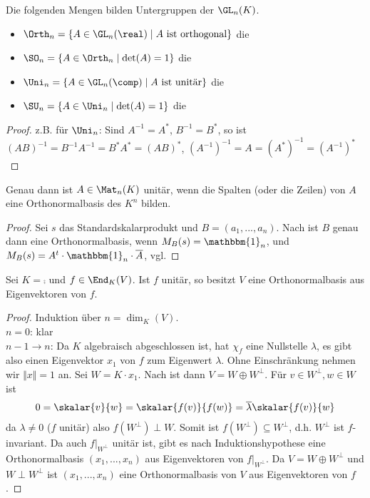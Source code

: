 \begin{proposition}
	Die folgenden Mengen bilden Untergruppen der $\GL_n(K)$.
	\begin{itemize}
		\item $\Orth_n=\{A\in\GL_n(\real)\mid A\text{ ist orthogonal}\}$ die 
		\item $\SO_n=\{A\in \Orth_n\mid \det(A)=1\}$ die 
		\item $\Uni_n=\{A\in\GL_n(\comp)\mid A\text{ ist unitär}\}$ die 
		\item $\SU_n=\{A\in \Uni_n\mid \det(A)=1\}$ die 
	\end{itemize}
\end{proposition}
\begin{proof}
	z.B. für $\Uni_n$: Sind $A^{-1}=A^*$, $B^{-1}=B^*$, so ist $(AB)^{-1}=B^{-1}A^{-1}=B^*A^*=(AB)^*$, $(A^{-1})^{-1}=A=(A^*)^{-1}=(A^{-1})^*$
\end{proof}

\begin{proposition}
	Genau dann ist $A\in\Mat_n(K)$ unitär, wenn die Spalten (oder die Zeilen) von $A$ eine Orthonormalbasis des $K^n$ bilden. 
\end{proposition}
\begin{proof}
	Sei $s$ das Standardskalarprodukt und $B=(a_1,...,a_n)$. Nach  ist $B$ genau dann eine Orthonormalbasis, wenn $M_B(s)=\mathbbm{1}_n$, und $M_B(s)=A^t\cdot\mathbbm{1}_n\cdot\overline{A}$, vgl. 
\end{proof}

\begin{theorem}
	Sei $K=\comp$ und $f\in\End_K(V)$. Ist $f$ unitär, so besitzt $V$ eine Orthonormalbasis aus Eigenvektoren von $f$.
\end{theorem}
\begin{proof}
	Induktion über $n=\dim_K(V)$. \\
	\emph{$n=0$}: klar \\
	\emph{$n-1\to n$}: Da $K$ algebraisch abgeschlossen ist, hat $\chi_f$ eine Nullstelle $\lambda$, es gibt also einen Eigenvektor $x_1$ von $f$ zum Eigenwert $\lambda$. Ohne Einschränkung nehmen wir $\Vert x\Vert=1$ an. Sei $W=K\cdot x_1$. Nach  ist dann $V=W\oplus W^\perp$. Für $v\in W^\perp, w\in W$ ist
	\begin{align}
		0=\skalar{v}{w}=\skalar{f(v)}{f(w)}=\overline{\lambda}\skalar{f(v)}{w}\notag
	\end{align}
	da $\lambda\neq 0$ ($f$ unitär) also $f(W^\perp)\perp W$. Somit ist $f(W^\perp)\subseteq W^\perp$, d.h. $W^\perp$ ist $f$-invariant. Da auch $f\vert_{W^\perp}$ unitär ist, gibt es nach Induktionshypothese eine Orthonormalbasis $(x_1,...,x_n)$ aus Eigenvektoren von $f\vert_{W^\perp}$. Da $V=W\oplus W^\perp$ und $W\perp W^\perp$ ist $(x_1,...,x_n)$ eine Orthonormalbasis von $V$ aus Eigenvektoren von $f$.
\end{proof}

